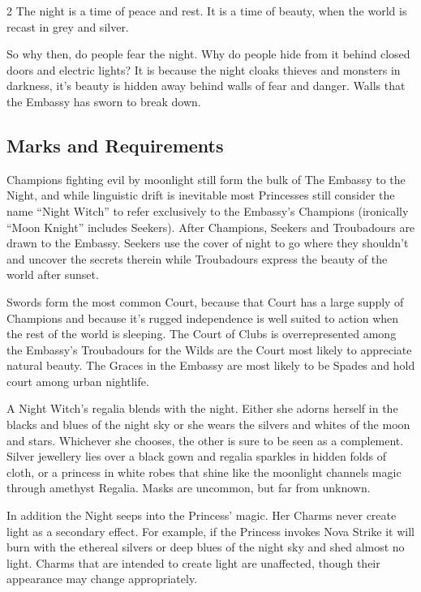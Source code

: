 \begin{multicols}{2}
The night is a time of peace and rest. It is a time of beauty, when the world is recast in grey and silver.

So why then, do people fear the night. Why do people hide from it behind closed doors and electric lights? It is because the night cloaks thieves and monsters in darkness, it’s beauty is hidden away behind walls of fear and danger. Walls that the Embassy has sworn to break down.

\subsection*{Marks and Requirements}

Champions fighting evil by moonlight still form the bulk of The Embassy to the Night, and while linguistic drift is inevitable most Princesses still consider the name “Night Witch” to refer exclusively to the Embassy’s Champions (ironically “Moon Knight” includes Seekers). After Champions, Seekers and Troubadours are drawn to the Embassy. Seekers use the cover of night to go where they shouldn’t and uncover the secrets therein while Troubadours express the beauty of the world after sunset. 

Swords form the most common Court, because that Court has a large supply of Champions and because it’s rugged independence is well suited to action when the rest of the world is sleeping. The Court of Clubs is overrepresented among the Embassy’s Troubadours for the Wilds are the Court most likely to appreciate natural beauty. The Graces in the Embassy are most likely to be Spades and hold court among urban nightlife. 

A Night Witch's regalia blends with the night. Either she adorns herself in the blacks and blues of the night sky or she wears the silvers and whites of the moon and stars. Whichever she chooses, the other is sure to be seen as a complement. Silver jewellery lies over a black gown and regalia sparkles in hidden folds of cloth, or a princess in white robes that shine like the moonlight channels magic through amethyst Regalia. Masks are uncommon, but far from unknown. 

In addition the Night seeps into the Princess’ magic. Her Charms never create light as a secondary effect. For example, if the Princess invokes Nova Strike it will burn with the ethereal silvers or deep blues of the night sky and shed almost no light. Charms that are intended to create light are unaffected, though their appearance may change appropriately. 


\end{multicols}
